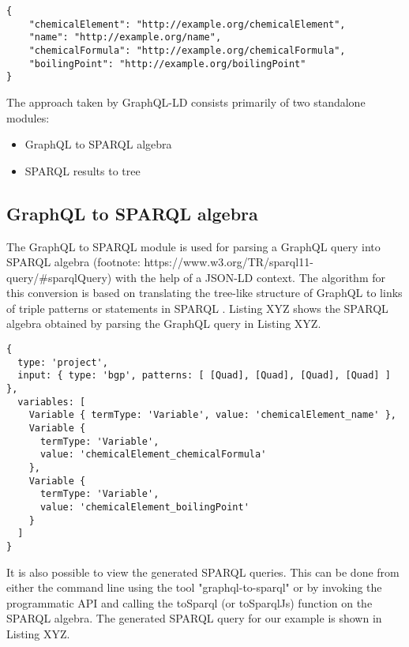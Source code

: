 \begin{minipage}{\linewidth}
\begin{lstlisting}[label=listing:listing7, caption={JSON-LD context}]
{
	"chemicalElement": "http://example.org/chemicalElement",
	"name": "http://example.org/name",
	"chemicalFormula": "http://example.org/chemicalFormula",
	"boilingPoint": "http://example.org/boilingPoint"
}
\end{lstlisting}
\end{minipage}

The approach taken by GraphQL-LD consists primarily of two standalone modules:
\begin{itemize}
	\item GraphQL to SPARQL algebra
	\item SPARQL results to tree
\end{itemize}


\subsection{GraphQL to SPARQL algebra}

The GraphQL to SPARQL module is used for parsing a GraphQL query into SPARQL algebra (footnote: https://www.w3.org/TR/sparql11-query/\#sparqlQuery) with the help of a JSON-LD context. The algorithm for this conversion is based on translating the tree-like structure of GraphQL to links of triple patterns or statements  in SPARQL \cite{Taelman2018}. Listing XYZ shows the SPARQL algebra obtained by parsing the GraphQL query in Listing XYZ.

\begin{minipage}{\linewidth}
\begin{lstlisting}[label=listing:listing8, caption={Generated SPARQL Algebra}]
{
  type: 'project',
  input: { type: 'bgp', patterns: [ [Quad], [Quad], [Quad], [Quad] ] },
  variables: [
    Variable { termType: 'Variable', value: 'chemicalElement_name' },
    Variable {
      termType: 'Variable',
      value: 'chemicalElement_chemicalFormula'
    },
    Variable {
      termType: 'Variable',
      value: 'chemicalElement_boilingPoint'
    }
  ]
}

\end{lstlisting}
\end{minipage}

It is also possible to view the generated SPARQL queries. This can be done from either the command line using the tool "graphql-to-sparql" or by invoking the programmatic API and calling the toSparql (or toSparqlJs) function on the SPARQL algebra. The generated SPARQL query for our example is shown in Listing XYZ.

